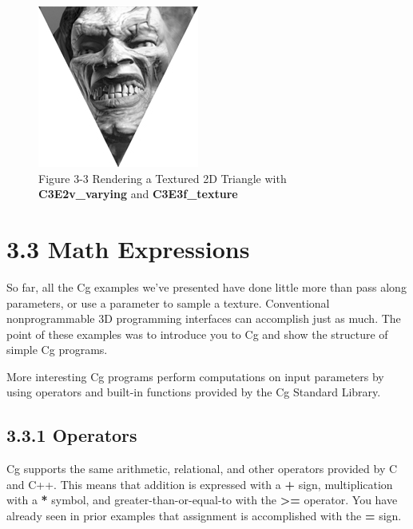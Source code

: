 \documentclass{book}
\begin{document}
\begin{figure}
    \centering
    \includegraphics[width=1\linewidth]{Images/fig3_3.jpg}
    \caption{Figure 3-3 Rendering a Textured 2D Triangle with \textbf{C3E2v_varying} and \textbf{C3E3f_texture}}
    \label{fig:3-3}
\end{figure}

\section{3.3 Math Expressions}

So far, all the Cg examples we've presented have done little more than pass along parameters, or use a parameter to sample a texture. Conventional nonprogrammable 3D programming interfaces can accomplish just as much. The point of these examples was to introduce you to Cg and show the structure of simple Cg programs.

More interesting Cg programs perform computations on input parameters by using operators and built-in functions provided by the Cg Standard Library.

\subsection{3.3.1 Operators}

Cg supports the same arithmetic, relational, and other operators provided by C and C++. This means that addition is expressed with a \textbf{+} sign, multiplication with a \textbf{*} symbol, and greater-than-or-equal-to with the \textbf{>=} operator. You have already seen in prior examples that assignment is accomplished with the \textbf{=} sign.
\end{document}
